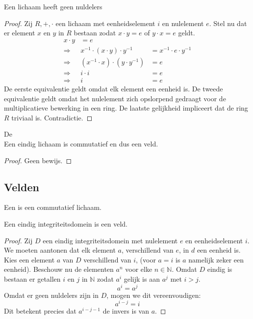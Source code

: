 \documentclass[main.tex]{subfiles}
\begin{document}
\begin{st}
  \label{st:lichaam-geen-nuldelers}
  Een lichaam heeft geen nuldelers

  \begin{proof}
    Zij $R,+,\cdot$ een lichaam met eenheidselement $i$ en nulelement $e$.
    Stel nu dat er element $x$ en $y$ in $R$ bestaan zodat $x\cdot y = e$ of $y \cdot x = e$ geldt.
    \[
    \begin{array}{rrl}
      x \cdot y &= e\\
      \Rightarrow & x^{-1} \cdot (x \cdot y) \cdot y^{-1} &= x^{-1} \cdot e \cdot y^{-1}\\
      \Rightarrow & (x^{-1} \cdot x) \cdot (y \cdot y^{-1}) &= e\\
      \Rightarrow & i \cdot i &= e\\
      \Rightarrow & i &= e
    \end{array}
    \]
    De eerste equivalentie geldt omdat elk element een eenheid is.
    De tweede equivalentie geldt omdat het nulelement zich opslorpend gedraagt voor de multiplicatieve bewerking in een ring.
    De laatste gelijkheid impliceert dat de ring $R$ triviaal is.
    Contradictie.
  \end{proof}
\end{st}

\begin{st}
  \label{st:stelling-van-wedderburn}
  De \\
  Een eindig lichaam is commutatief en dus een veld.

  \begin{proof}
    Geen bewijs.
  \end{proof}
\end{st}

\subsection{Velden}
\label{sec:velden}

\begin{de}
  Een  is een commutatief lichaam.
\end{de}

\begin{st}
  Een eindig integriteitsdomein is een veld.

  \begin{proof}
    Zij $D$ een eindig integriteitsdomein met nulelement $e$ en eenheidselement $i$.
    We moeten aantonen dat elk element $a$, verschillend van $e$, in $d$ een eenheid is.
    Kies een element $a$ van $D$ verschillend van $i$, (voor $a=i$ is $a$ namelijk zeker een eenheid).
    Beschouw nu de elementen $a^{n}$ voor elke $n\in \mathbb{N}$.
    Omdat $D$ eindig is bestaan er getallen $i$ en $j$ in $\mathbb{N}$ zodat $a^{i}$ gelijk is aan $a^{j}$ met $i > j$.
    \[ a^{i} = a^{j} \]
    Omdat er geen nuldelers zijn in $D$, mogen we dit vereenvoudigen:
    \[ a^{i-j} = i \]
    Dit betekent precies dat $a^{i-j-1}$ de invers is van $a$.
  \end{proof}
\end{st}
\end{document}
